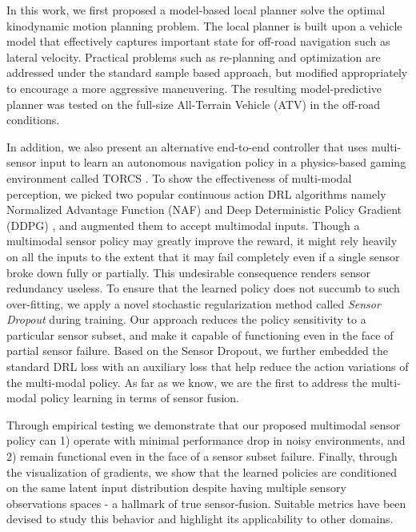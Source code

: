 \documentclass[../thesis.tex]{subfiles}
\begin{document}
In this work, we first proposed a model-based local planner solve the optimal kinodynamic motion planning problem. 
The local planner is built upon a vehicle model that effectively captures important state for off-road navigation such as lateral velocity. 
Practical problems such as re-planning and optimization are addressed under the standard sample based approach, but modified appropriately to encourage a more aggressive maneuvering. 
The resulting model-predictive planner was tested on the full-size All-Terrain Vehicle (ATV) in the off-road conditions.

In addition, we also present an alternative end-to-end controller that uses multi-sensor input to learn an autonomous navigation policy in a physics-based gaming environment called TORCS \cite{wymann2000torcs}. 
To show the effectiveness of multi-modal perception, we picked two popular continuous action DRL algorithms namely Normalized Advantage Function (NAF) \cite{CDQN} and Deep Deterministic Policy Gradient (DDPG) \cite{DBLP:journals/corr/LillicrapHPHETS15}, and augmented them to accept multimodal inputs. 
Though a multimodal sensor policy may greatly improve the reward, it might rely heavily on all the inputs to the extent that it may fail completely even if a single sensor broke down fully or partially. This undesirable consequence renders sensor redundancy useless. 
To ensure that the learned policy does not succumb to such over-fitting, we apply a novel stochastic regularization method called \emph{Sensor Dropout} during training. 
Our approach reduces the policy sensitivity to a particular sensor subset, and make it capable of functioning even in the face of partial sensor failure. 
Based on the Sensor Dropout, we further embedded the standard DRL loss with an auxiliary loss that help reduce the action variations of the multi-modal policy. 
As far as we know, we are the first to address the multi-modal policy learning in terms of sensor fusion.

Through empirical testing we demonstrate that our proposed multimodal sensor policy can 1) operate with minimal performance drop in noisy environments, and 2) remain functional even in the face of a sensor subset failure. 
Finally, through the visualization of gradients, we show that the learned policies are conditioned on the same latent input distribution despite having multiple sensory observations spaces - a hallmark of true sensor-fusion.
Suitable metrics have been devised to study this behavior and highlight its applicability to other domains.
\end{document}
